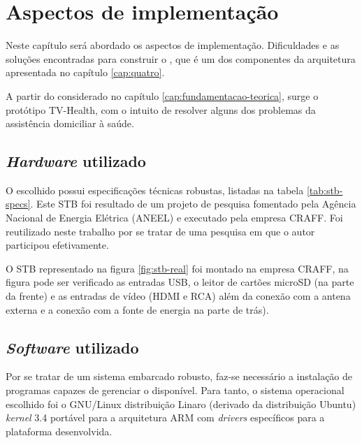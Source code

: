 \chapter{Aspectos de implementação} \label{cap:aspectos-de-implementacao}

Neste capítulo será abordado os aspectos de implementação. Dificuldades e as
soluções encontradas para construir o \software, que é um dos componentes
da arquitetura apresentada no capítulo \vref{cap:quatro}.


A partir do considerado no capítulo \ref{cap:fundamentacao-teorica}, surge o
protótipo TV-Health, com o intuito de resolver alguns dos problemas da
assistência domiciliar à saúde.

\section{\textit{Hardware} utilizado}

O \stb[] escolhido possui especificações técnicas robustas, listadas na 
tabela \ref{tab:stb-specs}. Este STB foi resultado de um projeto de pesquisa
fomentado pela Agência Nacional de Energia Elétrica (ANEEL) e executado pela
empresa CRAFF. Foi reutilizado neste trabalho por se tratar de 
uma pesquisa em que o autor participou efetivamente.


O STB representado na figura \vref{fig:stb-real} foi montado na empresa
CRAFF, na figura pode ser verificado as entradas USB, o leitor de cartões
microSD (na parte da frente) e as entradas de vídeo (HDMI e RCA) além da 
conexão com a antena externa e a conexão com a fonte de energia na
parte de trás).

\section{\textit{Software} utilizado}

Por se tratar de um sistema embarcado robusto, faz-se necessário a instalação
de programas capazes de gerenciar o \hardware[] disponível. Para tanto, o
sistema operacional escolhido foi o GNU/Linux distribuição Linaro (derivado da
distribuição Ubuntu) \textit{kernel} 3.4 portável para a arquitetura 
ARM com \textit{drivers} específicos para a plataforma desenvolvida.

